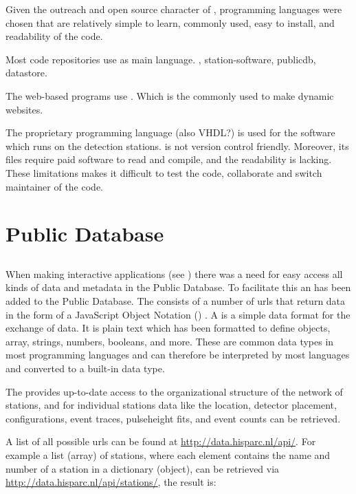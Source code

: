 Given the outreach and open source character of \hisparc, programming languages were chosen that are relatively simple to learn, commonly used, easy to install, and readability of the code.

Most code repositories use \python as main language.
\sapphire, station-software, publicdb, datastore.

The web-based programs use \javascript. Which is the commonly used to make dynamic websites.

The proprietary programming language \labview (also VHDL?) is used for the  \daq software which runs on the detection stations. \labview is not version control friendly. Moreover, its files require paid software to read and compile, and the readability is lacking. These limitations makes it difficult to test the code, collaborate and switch maintainer of the code.




\section{\hisparc Public Database}

\subsection{\api}

When making interactive applications (see \jsparc) there was a need for easy access all kinds of data and metadata in the Public Database. To facilitate this an \api has been added to the Public Database. The \api consists of a number of urls that return data in the form of a JavaScript Object Notation (\json) \cite{rfc7159}. A \json is a simple data format for the exchange of data. It is plain text which has been formatted to define objects, array, strings, numbers, booleans, and more. These are common data types in most programming languages and can therefore be interpreted by most languages and converted to a built-in data type.

The \api provides up-to-date access to the organizational structure of the \hisparc network of stations, and for individual stations data like the \gps location, detector placement, configurations, event traces, pulseheight fits, and event counts can be retrieved.

A list of all possible urls can be found at \url{http://data.hisparc.nl/api/}. For example a list (array) of \hisparc stations, where each element contains the name and number of a station in a dictionary (object), can be retrieved via \url{http://data.hisparc.nl/api/stations/}, the result is:


